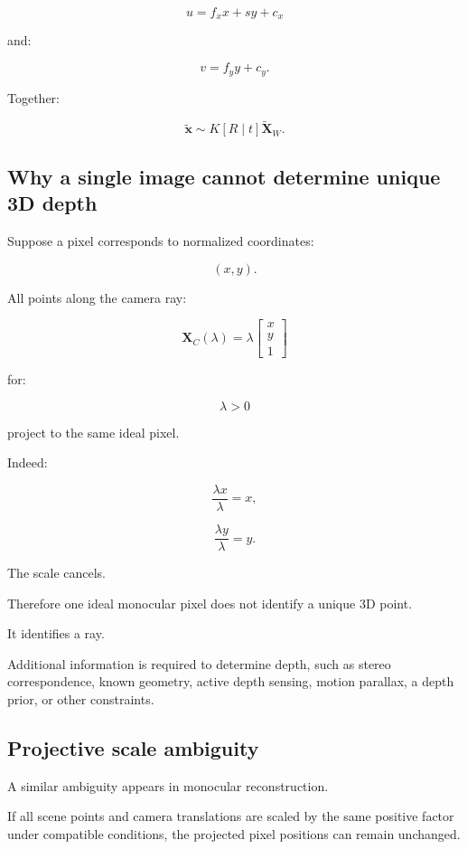 \[
 \boxed{ u=f_xx+sy+c_x }
\]

and:

\[
 \boxed{ v=f_yy+c_y }.
\]

Together:

\[
 \boxed{ \tilde{\mathbf x} \sim K[R\mid t]\tilde{\mathbf X}_W }.
\]

\subsection{Why a single image cannot determine unique 3D depth}\label{02-foundations-ii-ch035-why-a-single-image-cannot-determine-unique-3d-depth}

Suppose a pixel corresponds to normalized coordinates:

\[
 (x,y).
\]

All points along the camera ray:

\[
 \boxed{ \mathbf X_C(\lambda)= \lambda \begin{bmatrix} x\\y\\1 \end{bmatrix} }
\]

for:

\[
 \lambda>0
\]

project to the same ideal pixel.

Indeed:

\[
 \frac{\lambda x}{\lambda}=x,
\]

\[
 \frac{\lambda y}{\lambda}=y.
\]

The scale cancels.

Therefore one ideal monocular pixel does not identify a unique 3D point.

It identifies a ray.

Additional information is required to determine depth, such as stereo correspondence, known geometry, active depth sensing, motion parallax, a depth prior, or other constraints.

\subsection{Projective scale ambiguity}\label{02-foundations-ii-ch035-projective-scale-ambiguity}

A similar ambiguity appears in monocular reconstruction.

If all scene points and camera translations are scaled by the same positive factor under compatible conditions, the projected pixel positions can remain unchanged.

